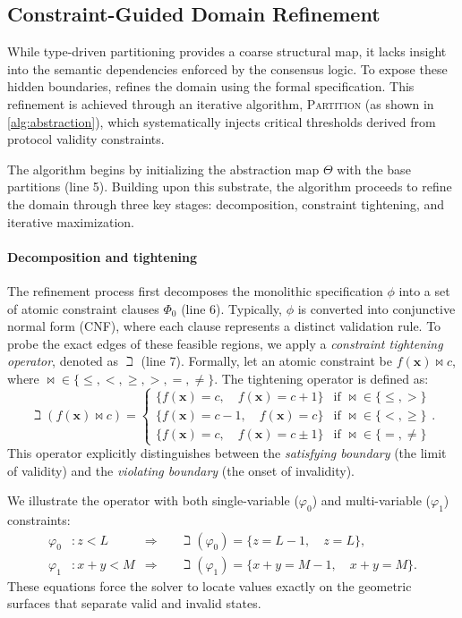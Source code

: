 \subsection{Constraint-Guided Domain Refinement}
\label{sec:spec_derivation}

While type-driven partitioning provides a coarse structural map, it lacks insight into the semantic dependencies enforced by the consensus logic. To expose these hidden boundaries, \tool refines the domain using the formal specification. This refinement is achieved through an iterative algorithm, \textsc{Partition} (as shown in \autoref{alg:abstraction}), which systematically injects critical thresholds derived from protocol validity constraints.

The algorithm begins by initializing the abstraction map $\Theta$ with the base partitions (line 5). Building upon this substrate, the algorithm proceeds to refine the domain through three key stages: decomposition, constraint tightening, and iterative maximization.

\paragraph{Decomposition and tightening}
The refinement process first decomposes the monolithic specification $\phi$ into a set of atomic constraint clauses $\Phi_0$ (line 6). Typically, $\phi$ is converted into conjunctive normal form (CNF), where each clause represents a distinct validation rule.
To probe the exact edges of these feasible regions, we apply a \textit{constraint tightening operator}, denoted as $\beth$ (line 7). Formally, let an atomic constraint be $f(\mathbf{x}) \bowtie c$, where $\bowtie \in \{ \le, <, \ge, >, =, \neq \}$. The tightening operator is defined as:
\[
\beth(f(\mathbf{x}) \bowtie c) = 
\begin{cases} 
\{ f(\mathbf{x}) = c, \quad f(\mathbf{x}) = c + 1 \} & \text{if } \bowtie \in \{ \le, > \} \\
\{ f(\mathbf{x}) = c - 1, \quad f(\mathbf{x}) = c \} & \text{if } \bowtie \in \{ <, \ge \} \\
\{ f(\mathbf{x}) = c, \quad f(\mathbf{x}) = c \pm 1 \} & \text{if } \bowtie \in \{ =, \neq \}
\end{cases}.
\]
This operator explicitly distinguishes between the \textit{satisfying boundary} (the limit of validity) and the \textit{violating boundary} (the onset of invalidity).

\begin{example}
We illustrate the operator with both single-variable ($\varphi_0$) and multi-variable ($\varphi_1$) constraints:
\[
\begin{aligned}
\varphi_0 &: z < L  & \Rightarrow \quad & \beth(\varphi_0) = \{ z = L - 1, \quad z = L \}, \\
\varphi_1 &: x + y < M & \Rightarrow \quad & \beth(\varphi_1) = \{ x + y = M - 1, \quad x + y = M \}.
\end{aligned}
\]
These equations force the solver to locate values exactly on the geometric surfaces that separate valid and invalid states.
\end{example}

